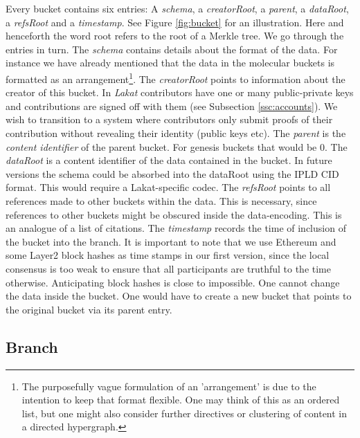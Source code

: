 Every bucket contains six entries: A \textit{schema}, a \textit{creatorRoot}, a \textit{parent}, a \textit{dataRoot}, a \textit{refsRoot} and a \textit{timestamp}. See Figure \ref{fig:bucket} for an illustration. Here and henceforth the word root refers to the root of a Merkle tree. We go through the entries in turn. The \textit{schema} contains details about the format of the data. For instance we have already mentioned that the data in the molecular buckets is formatted as an arrangement\footnote{The purposefully vague formulation of an 'arrangement' is due to the intention to keep that format flexible. One may think of this as an ordered list, but one might also consider further directives or clustering of content in a directed hypergraph.}. The \textit{creatorRoot} points to information about the creator of this bucket. In \textit{Lakat} contributors have one or many public-private keys and contributions are signed off with them (see Subsection \ref{ssc:accounts}). We wish to transition to a system where contributors only submit proofs of their contribution without revealing their identity (public keys etc). The \textit{parent} is the \textit{content identifier} of the parent bucket. For genesis buckets that would be 0. The \textit{dataRoot} is a content identifier of the data contained in the bucket. In future versions the schema could be absorbed into the dataRoot using the IPLD CID format. This would require a Lakat-specific codec. The \textit{refsRoot} points to all references made to other buckets within the data. This is necessary, since references to other buckets might be obscured inside the data-encoding. This is an analogue of a list of citations. The \textit{timestamp} records the time of inclusion of the bucket into the branch. It is important to note that we use Ethereum \cite{buterin2013ethereum} and some Layer2 block hashes as time stamps in our first version, since the local consensus is too weak to ensure that all participants are truthful to the time otherwise. Anticipating block hashes is close to impossible. One cannot change the data inside the bucket. One would have to create a new bucket that points to the original bucket via its parent entry. 




\subsection{Branch}
\label{ssc:branch}

